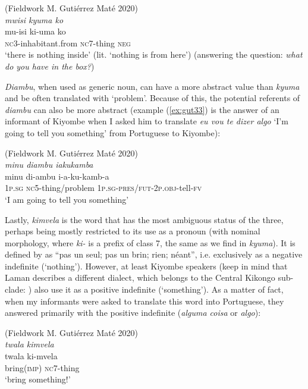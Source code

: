 \documentclass[output=paper,colorlinks,citecolor=brown]{langscibook}
\begin{document}
\ea \label{ex:gut32}
    (Fieldwork M. Gutiérrez Maté 2020)\\
    \textit{mwisi kyuma ko}\\
    \gll mu-isi ki-uma ko\\
    \textsc{nc}3-inhabitant.from \textsc{nc}7-thing \textsc{neg}\\
    \glt ‘there is nothing inside’ (lit. ‘nothing is from here’) (answering the question: \textit{what do you have in the box?})
\z

\textit{Diambu}, when used as generic noun, can have a more abstract value than \textit{kyuma} and be often translated with ‘problem’. Because of this, the potential referents of \textit{diambu} can also be more abstract (example (\ref{ex:gut33}) is the answer of an informant of Kiyombe when I asked him to translate \textit{eu vou te dizer algo} ‘I’m going to tell you something’ from Portuguese to Kiyombe):

\ea \label{ex:gut33}
    (Fieldwork M. Gutiérrez Maté 2020)\\
    \textit{minu diambu iakukamba}\\
    \gll minu di-ambu i-a-ku-kamb-a\footnotemark\\
    \textsc{1p.sg} \textsc{nc5}-thing/problem \textsc{1p.sg-pres/fut-2p.obj}-tell-\textsc{fv}\\
    \glt‘I am going to tell you something’
\z
{}

Lastly, \textit{kimvela} is the word that has the most ambiguous status of the three, perhaps being mostly restricted to its use as a pronoun (with nominal morphology, where \textit{ki-} is a prefix of class 7, the same as we find in \textit{kyuma}). It is defined by \citet[][s.v.]{Laman1936} as “pas un seul; pas un brin; rien; néant”, i.e. exclusively as a negative indefinite (‘nothing’). However, at least Kiyombe speakers (keep in mind that Laman describes a different dialect, which belongs to the Central Kikongo sub-clade: \cite[][147]{BostoenDeSchryver2015}) also use it as a positive indefinite (‘something’). As a matter of fact, when my informants were asked to translate this word into Portuguese, they answered primarily with the positive indefinite (\textit{alguma coisa} or \textit{algo}):

\ea \label{ex:gut34}
    (Fieldwork M. Gutiérrez Maté 2020)\\
    \textit{twala kimvela}\\
    \gll twala ki-mvela\\
    bring(\textsc{imp}) \textsc{nc7}-thing\\
    \glt ‘bring something!’
\z
\end{document}
